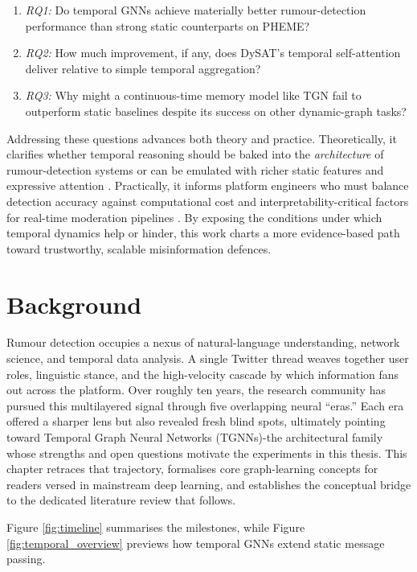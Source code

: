 \documentclass{cshonours}
\begin{document}
\begin{enumerate}
    \item \emph{RQ1:} Do temporal GNNs achieve materially better rumour-detection performance than strong static counterparts on PHEME?  
    \item \emph{RQ2:} How much improvement, if any, does DySAT's temporal self-attention deliver relative to simple temporal aggregation?  
    \item \emph{RQ3:} Why might a continuous-time memory model like TGN fail to outperform static baselines despite its success on other dynamic-graph tasks?  
\end{enumerate}


Addressing these questions advances both theory and practice.  Theoretically, it clarifies whether temporal reasoning should be baked into the \emph{architecture} of rumour-detection systems or can be emulated with richer static features and expressive attention \cite{choi2021dynGCN}.  Practically, it informs platform engineers who must balance detection accuracy against computational cost and interpretability-critical factors for real-time moderation pipelines \cite{survey2024disinfo}.  By exposing the conditions under which temporal dynamics help or hinder, this work charts a more evidence-based path toward trustworthy, scalable misinformation defences.


\chapter{Background}\label{chap:background}

Rumour detection occupies a nexus of natural-language understanding, network science, and temporal data analysis.  A single Twitter thread weaves together user roles, linguistic stance, and the high-velocity cascade by which information fans out across the platform.  Over roughly ten years, the research community has pursued this multilayered signal through five overlapping neural ``eras.''  Each era offered a sharper lens but also revealed fresh blind spots, ultimately pointing toward Temporal Graph Neural Networks (TGNNs)-the architectural family whose strengths and open questions motivate the experiments in this thesis.  This chapter retraces that trajectory, formalises core graph-learning concepts for readers versed in mainstream deep learning, and establishes the conceptual bridge to the dedicated literature review that follows.  

Figure \ref{fig:timeline} summarises the milestones, while Figure \ref{fig:temporal_overview} previews how temporal GNNs extend static message passing.
\end{document}
